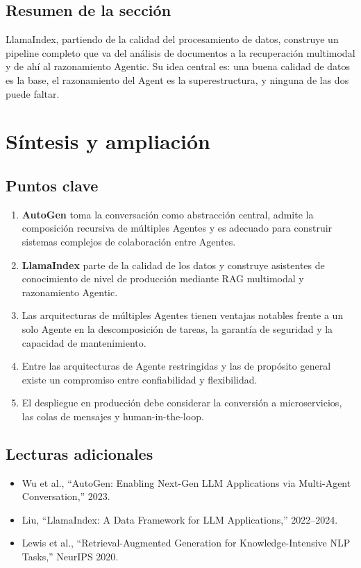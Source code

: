 \documentclass[a4paper]{article}
\begin{document}
\subsection{Resumen de la sección}

LlamaIndex, partiendo de la calidad del procesamiento de datos, construye un pipeline completo que va del análisis de documentos a la recuperación multimodal y de ahí al razonamiento Agentic. Su idea central es: una buena calidad de datos es la base, el razonamiento del Agent es la superestructura, y ninguna de las dos puede faltar.

\section{Síntesis y ampliación}

\subsection{Puntos clave}

\begin{enumerate}
    \item \textbf{AutoGen} toma la conversación como abstracción central, admite la composición recursiva de múltiples Agentes y es adecuado para construir sistemas complejos de colaboración entre Agentes.
    \item \textbf{LlamaIndex} parte de la calidad de los datos y construye asistentes de conocimiento de nivel de producción mediante RAG multimodal y razonamiento Agentic.
    \item Las arquitecturas de múltiples Agentes tienen ventajas notables frente a un solo Agente en la descomposición de tareas, la garantía de seguridad y la capacidad de mantenimiento.
    \item Entre las arquitecturas de Agente restringidas y las de propósito general existe un compromiso entre confiabilidad y flexibilidad.
    \item El despliegue en producción debe considerar la conversión a microservicios, las colas de mensajes y human-in-the-loop.
\end{enumerate}

\subsection{Lecturas adicionales}

\begin{itemize}
    \item Wu et al., ``AutoGen: Enabling Next-Gen LLM Applications via Multi-Agent Conversation,'' 2023.
    \item Liu, ``LlamaIndex: A Data Framework for LLM Applications,'' 2022--2024.
    \item Lewis et al., ``Retrieval-Augmented Generation for Knowledge-Intensive NLP Tasks,'' NeurIPS 2020.
\end{itemize}
\end{document}
